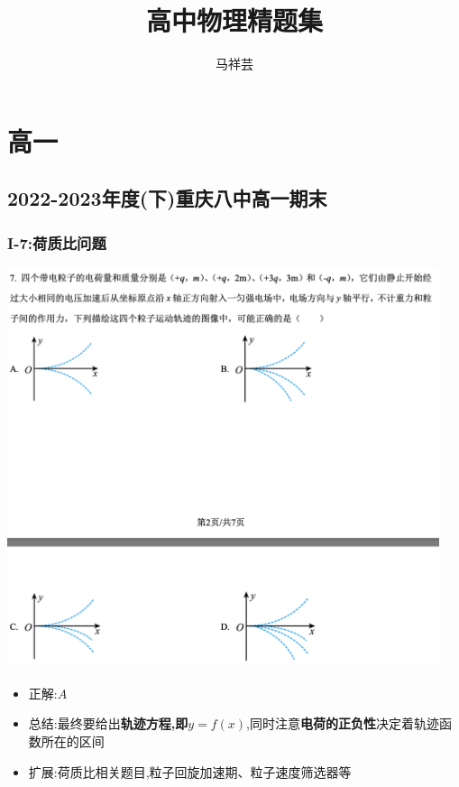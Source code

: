 \documentclass{article}
\title{高中物理精题集}
\author{马祥芸}
\begin{document}
\maketitle
\tableofcontents
\newpage

\section{高一}

\subsection{2022-2023年度(下)重庆八中高一期末}

\subsubsection{I-7:荷质比问题}
\includegraphics[width=0.95\textwidth,keepaspectratio]{./pictures/1.1-1.png}

\begin{itemize}
    \item 正解:\quad $A$
    \item 总结:最终要给出\textbf{轨迹方程,即$ y = f(x) $},同时注意\textbf{电荷的正负性}决定着轨迹函数所在的区间
    \item 扩展:荷质比相关题目,粒子回旋加速期、粒子速度筛选器等
\end{itemize}

\vspace{2em}
\end{document}
